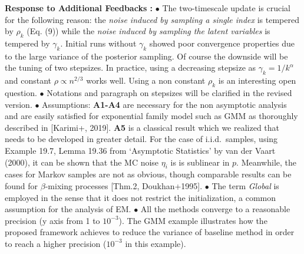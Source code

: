 \documentclass{article}
\begin{document}
\textbf{Response to Additional Feedbacks :}
$\bullet$ The two-timescale update is crucial for the following reason: the \emph{noise induced by sampling a single index} is tempered by $\rho_k$ (Eq. (9)) while the \emph{noise induced by sampling the latent variables} is tempered by $\gamma_k$. 
Initial runs without $\gamma_k$ showed poor convergence properties due to the large variance of the posterior sampling.
Of course the downside will be the tuning of two stepsizes. 
In practice, using a decreasing stepsize as $\gamma_k = 1/k^{\alpha}$ and constant $\rho \propto n^{2/3}$ works well.
Using a non constant $\rho_k$ is an interesting open question.
$\bullet$ Notations and paragraph on stepsizes will be clarified in the revised version.
$\bullet$ Assumptions: \textbf{A1-A4} are necessary for the non asymptotic analysis and are easily satisfied for exponential family model such as GMM as thoroughly described in [Karimi+, 2019].
\textbf{A5} is a classical result which we realized that needs to be developed in greater detail. For the case of i.i.d.~samples, using Example 19.7, Lemma 19.36 from `Asymptotic Statistics' by van der Vaart (2000), it can be shown that the MC noise $\eta_i$ is is sublinear in $p$. Meanwhile, the cases for Markov samples are not as obvious, though comparable results can be found for $\beta$-mixing processes [Thm.2, Doukhan+1995]. 
$\bullet$ The term \emph{Global} is employed in the sense that it does not restrict the initialization, a common assumption for the analysis of EM.
$\bullet$ All the methods converge to a reasonable precision (y axis from 1 to $10^{-3}$).
The GMM example illustrates how the proposed framework achieves to reduce the variance of baseline method in order to reach a higher precision ($10^{-3}$ in this example).
\end{document}
